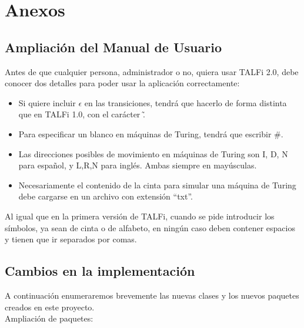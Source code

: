 \documentclass[12pt,a4paper,spanish]{book}
\begin{document}
\chapter{Anexos}
\section{Ampliaci\'on del Manual de Usuario}
Antes de que cualquier persona, administrador o no, quiera usar TALFi 2.0, debe conocer dos detalles para poder usar la aplicaci\'on correctamente:\\
\begin{itemize}
\item Si quiere incluir $\epsilon$ en las transiciones, tendr\'a que hacerlo de forma distinta que en TALFi 1.0, con el car\'acter \~.
\item Para especificar un blanco en m\'aquinas de Turing, tendr\'a que escribir $\#$.
\item Las direcciones posibles de movimiento en m\'aquinas de Turing son I, D, N para espa\~nol, y L,R,N para ingl\'es. Ambas siempre en may\'usculas. 
\item Necesariamente el contenido de la cinta para simular una m\'aquina de Turing debe cargarse en un archivo con extensi\'on ``txt''.
\end{itemize}
Al igual que en la primera versi\'on de TALFi, cuando se pide introducir los s\'imbolos, ya sean de cinta o de alfabeto, en ning\'un caso deben contener espacios y tienen que ir separados por comas.

\newpage
\section{Cambios en la implementaci\'on}
A continuaci\'on enumeraremos brevemente las nuevas clases y los nuevos paquetes creados en este proyecto.\\
Ampliaci\'on de paquetes:
\end{document}
